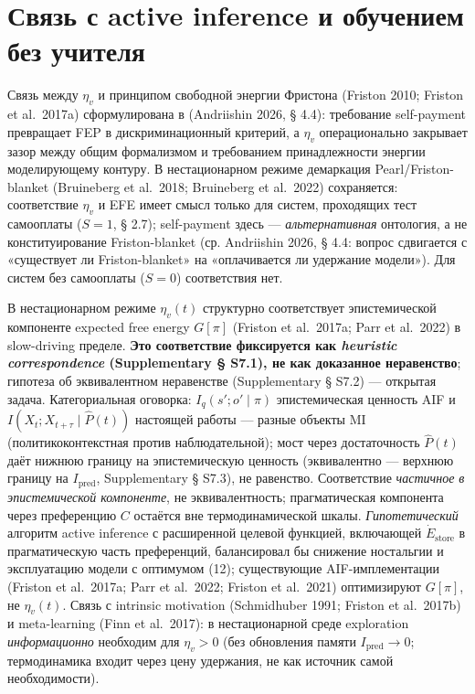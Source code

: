 \documentclass[pdflatex,sn-mathphys-ay]{sn-jnl}
\begin{document}
\section{Связь с active inference и обучением без учителя}\label{ux441ux432ux44fux437ux44c-ux441-active-inference-ux438-ux43eux431ux443ux447ux435ux43dux438ux435ux43c-ux431ux435ux437-ux443ux447ux438ux442ux435ux43bux44f}



Связь между \(\eta_v\) и принципом свободной энергии Фристона (Friston 2010; Friston et al.~2017a) сформулирована в (Andriishin 2026, § 4.4): требование self-payment превращает FEP в дискриминационный критерий, а \(\eta_v\) операционально закрывает зазор между общим формализмом и требованием принадлежности энергии моделирующему контуру. В нестационарном режиме демаркация Pearl/Friston-blanket (Bruineberg et al.~2018; Bruineberg et al.~2022) сохраняется: соответствие \(\eta_v\) и EFE имеет смысл только для систем, проходящих тест самооплаты (\(S=1\), § 2.7); self-payment здесь --- \emph{альтернативная} онтология, а не конституирование Friston-blanket (ср. Andriishin 2026, § 4.4: вопрос сдвигается с «существует ли Friston-blanket» на «оплачивается ли удержание модели»). Для систем без самооплаты (\(S=0\)) соответствия нет.



В нестационарном режиме \(\eta_v(t)\) структурно соответствует эпистемической компоненте expected free energy \(G[\pi]\) (Friston et al.~2017a; Parr et al.~2022) в slow-driving пределе. \textbf{Это соответствие фиксируется как \emph{heuristic correspondence} (Supplementary § S7.1), не как доказанное неравенство}; гипотеза об эквивалентном неравенстве (Supplementary § S7.2) --- открытая задача. Категориальная оговорка: \(I_q(s'; o' \mid \pi)\) эпистемическая ценность AIF и \(I(X_t; X_{t+\tau} \mid \hat P(t))\) настоящей работы --- разные объекты MI (политикоконтекстная против наблюдательной); мост через достаточность \(\hat P(t)\) даёт нижнюю границу на эпистемическую ценность (эквивалентно --- верхнюю границу на \(I_{\text{pred}}\), Supplementary § S7.3), не равенство. Соответствие \emph{частичное в эпистемической компоненте}, не эквивалентность; прагматическая компонента через преференцию \(C\) остаётся вне термодинамической шкалы. \emph{Гипотетический} алгоритм active inference с расширенной целевой функцией, включающей \(\dot E_{\text{store}}\) в прагматическую часть преференций, балансировал бы снижение ностальгии и эксплуатацию модели с оптимумом (12); существующие AIF-имплементации (Friston et al.~2017a; Parr et al.~2022; Friston et al.~2021) оптимизируют \(G[\pi]\), не \(\eta_v(t)\). Связь с intrinsic motivation (Schmidhuber 1991; Friston et al.~2017b) и meta-learning (Finn et al.~2017): в нестационарной среде exploration \emph{информационно} необходим для \(\eta_v > 0\) (без обновления памяти \(I_{\text{pred}} \to 0\); термодинамика входит через цену удержания, не как источник самой необходимости).
\end{document}
